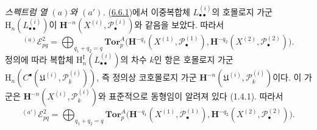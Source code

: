 \begin{env}[6.6.3]
\label{III.6.6.3-fr}
\emph{스펙트럼 열 $(a)$와 $(a')$.}
(\hyperref[III.6.6.1-fr]{6.6.1})에서 이중복합체
$L_{\bullet\bullet}^{(i)}$의 호몰로지 가군
$\mathrm H_n(L_{\bullet\bullet}^{(i)})$이
$\mathbf H^{-n}(X^{(i)},\mathscr P_\bullet^{(i)})$와 같음을 보았다.
따라서
\[
  {}^{(a)}\mathscr E_{pq}^2
  =\bigoplus_{q_1+q_2=q}
   \mathbf{Tor}_p^A
   \bigl(\mathbf H^{-q_1}(X^{(1)},\mathscr P_\bullet^{(1)}),
         \mathbf H^{-q_2}(X^{(2)},\mathscr P_\bullet^{(2)})\bigr).
\]
정의에 따라 복합체
$\mathrm H_n^{\mathrm I}(L_{\bullet\bullet}^{(i)})$의 차수 $k$인 항은
호몰로지 가군
$\mathrm H_n(C^\bullet(\mathfrak U^{(i)},\mathscr P_k^{(i)}))$, 즉
정의상 코호몰로지 가군
$\mathbf H^{-n}(\mathfrak U^{(i)},\mathscr P_k^{(i)})$이다. 이 가군은
$\mathbf H^{-n}(X^{(i)},\mathscr P_k^{(i)})$와 표준적으로 동형임이
알려져 있다 (1.4.1). 따라서
\[
  {}^{(a')}\mathscr E_{pq}^2
  =\bigoplus_{q_1+q_2=q}
   \mathbf{Tor}_p^A
   \bigl(\mathbf H^{-q_1}(X^{(1)},\mathscr P_\bullet^{(1)}),
         \mathbf H^{-q_2}(X^{(2)},\mathscr P_\bullet^{(2)})\bigr).
\]
\end{env}

